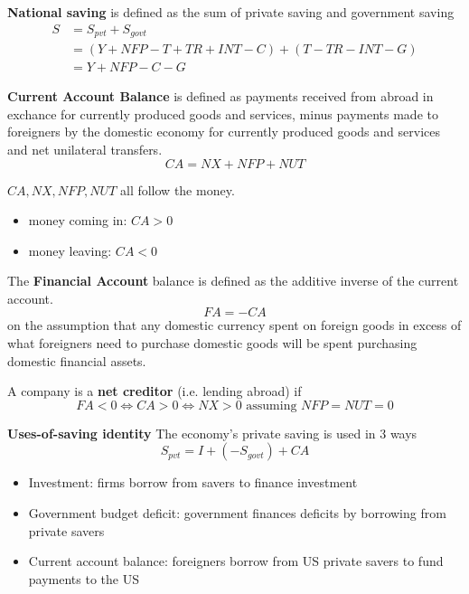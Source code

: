 \begin{definition}
    \textbf{National saving} is defined as the sum of private saving and government saving 
    \begin{align*}
        S &= S_{pvt} + S_{govt} \\
        &= (Y + NFP - T + TR + INT - C) + ( T - TR - INT - G) \\
        &= Y + NFP - C - G
    \end{align*}
\end{definition}

\begin{definition}
    \textbf{Current Account Balance} is defined as payments received from abroad in exchance for currently produced goods and services, minus payments made to foreigners by the domestic economy for currently produced goods and services and net unilateral transfers.
    \[
    CA = NX + NFP + NUT
    \]
\end{definition}

\begin{remark}
    $CA, NX, NFP, NUT$ all follow the money.
    \begin{itemize}
        \item money coming in: $CA > 0$
        \item money leaving: $CA < 0$
    \end{itemize} 
\end{remark}

\begin{definition}The \textbf{Financial Account} balance is defined as the additive inverse of the current account. 
    \[
        FA = - CA
    \] 
    on the assumption that any domestic currency spent on foreign goods in excess of what foreigners need to purchase domestic goods will be spent purchasing domestic financial assets.
\end{definition}
\begin{remark}
    A company is a \textbf{net creditor} (i.e. lending abroad) if 
    \[
        FA < 0 \iff CA > 0 \iff NX > 0 \text{ assuming } NFP = NUT = 0
    \]
\end{remark}


\begin{theorem}
    \textbf{Uses-of-saving identity} The economy's private saving is used in 3 ways 
    \[
        S_{pvt} = I + (- S_{govt}) + CA
    \]
    \begin{itemize}
        \item Investment: firms borrow from savers to finance investment
        \item Government budget deficit: government finances deficits by borrowing from private savers
        \item Current account balance: foreigners borrow from US private savers to fund payments to the US
    \end{itemize} 
\end{theorem}

